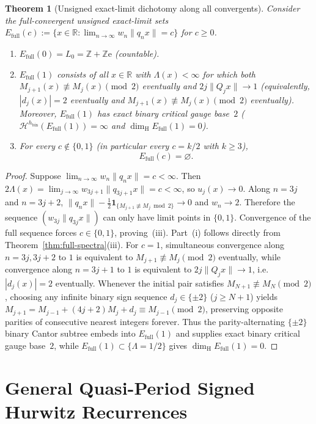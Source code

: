 \documentclass[11pt]{article}
\newtheorem{theorem}{Theorem}[section]
\theoremstyle{definition}
\theoremstyle{remark}
\newcommand{\R}{\mathbb{R}}
\newcommand{\Z}{\mathbb{Z}}
\newcommand{\ee}{\mathrm{e}}
\newcommand{\dimH}{\dim_{\mathrm{H}}}
\newcommand{\Lam}{\Lambda}
\begin{document}
\begin{theorem}[Unsigned exact-limit dichotomy along all convergents]\label{thm:full-exact-lim}
Consider the full-convergent unsigned exact-limit sets
$E_{\mathrm{full}}(c):=\{x\in\R:\lim_{n\to\infty} w_n\|q_n x\|=c\}$ for $c\ge0$.
\begin{enumerate}[label=\textup{(\roman*)},leftmargin=2.2em]
\item $E_{\mathrm{full}}(0)=L_0=\Z+\Z\ee$ (countable).
\item $E_{\mathrm{full}}(1)$ consists of all $x\in\R$ with $\Lam(x)<\infty$ for which
both $M_{j+1}(x)\not\equiv M_j(x)\pmod 2$ eventually and $2j\|Q_j x\|\to 1$
(equivalently, $|d_j(x)|=2$ eventually and $M_{j+1}(x)\not\equiv M_j(x)\pmod 2$
eventually). Moreover, $E_{\mathrm{full}}(1)$ has exact binary critical gauge
base~$2$ ($\mathcal H^{h_{\mathrm{bin}}}(E_{\mathrm{full}}(1))=\infty$ and
$\dimH E_{\mathrm{full}}(1)=0$).
\item For every $c\notin\{0,1\}$ (in particular every $c=k/2$ with $k\ge3$),
\[
E_{\mathrm{full}}(c)=\varnothing.
\]
\end{enumerate}
\end{theorem}

\begin{proof}
Suppose $\lim_{n\to\infty} w_n\|q_n x\|=c<\infty$. Then
$2\Lam(x)=\lim_{j\to\infty}w_{3j+1}\|q_{3j+1}x\|=c<\infty$, so $u_j(x)\to0$.
Along $n=3j$ and $n=3j+2$, $\|q_n x\|-\frac12\mathbf{1}_{\{M_{j+1}\not\equiv M_j\bmod 2\}}\to0$
and $w_n\to 2$. Therefore the sequence $(w_{3j}\|q_{3j}x\|)$ can only have limit
points in $\{0,1\}$. Convergence of the full sequence forces $c\in\{0,1\}$,
proving~(iii). Part~(i) follows directly from Theorem~\ref{thm:full-spectra}(iii).
For $c=1$, simultaneous convergence along $n=3j,3j+2$ to $1$ is equivalent to
$M_{j+1}\not\equiv M_j\pmod 2$ eventually, while convergence along $n=3j+1$ to $1$
is equivalent to $2j\|Q_j x\|\to 1$, i.e.\ $|d_j(x)|=2$ eventually. Whenever the
initial pair satisfies $M_{N+1}\not\equiv M_N\pmod 2$, choosing any infinite
binary sign sequence $d_j\in\{\pm 2\}$ ($j\ge N+1$) yields
$M_{j+1}=M_{j-1}+(4j+2)M_j+d_j\equiv M_{j-1}\pmod 2$, preserving opposite parities
of consecutive nearest integers forever. Thus the parity-alternating $\{\pm 2\}$
binary Cantor subtree embeds into $E_{\mathrm{full}}(1)$ and supplies exact
binary critical gauge base~$2$, while $E_{\mathrm{full}}(1)\subset\{\Lam=1/2\}$
gives $\dimH E_{\mathrm{full}}(1)=0$.
\end{proof}

\section{General Quasi-Period Signed Hurwitz Recurrences}\label{sec:even-hurwitz}
\end{document}
